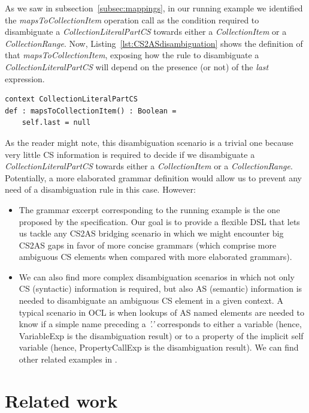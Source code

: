 \documentclass{llncs}
\begin{document}
As we saw in subsection~\ref{subsec:mappings}, in our running example we identified the \emph{mapsToCollectionItem} operation call as the condition required to disambiguate a \emph{CollectionLiteralPartCS} towards either a \emph{CollectionItem} or a \emph{CollectionRange}. Now, Listing~\ref{lst:CS2ASdisambiguation} shows the definition of that \emph{mapsToCollectionItem}, exposing how the rule to disambiguate a \emph{CollectionLiteralPartCS} will depend on the presence (or not) of the \emph{last} expression.

\begin{lstlisting}[caption=CS disambiguation rule of the running example, label=lst:CS2ASdisambiguation, language=OCL]
context CollectionLiteralPartCS
def : mapsToCollectionItem() : Boolean =
	self.last = null
\end{lstlisting}

As the reader might note, this disambiguation scenario is a trivial one because very little CS information is required to decide if we disambiguate a \emph{CollectionLiteralPartCS} towards either a \emph{CollectionItem} or a \emph{CollectionRange}. Potentially, a more elaborated grammar definition would allow us to prevent any need of a disambiguation rule in this case. However:

\begin{itemize}
\item The grammar excerpt corresponding to the running example is the one proposed by the specification. Our goal is to provide a flexible DSL that lets us tackle any CS2AS bridging scenario in which we might encounter big CS2AS gaps in favor of more concise grammars (which comprise more ambiguous CS elements when compared with more elaborated grammars).
\item We can also find more complex disambiguation scenarios in which not only CS (syntactic) information is required, but also AS (semantic) information is needed to disambiguate an ambiguous CS element in a given context. A typical scenario in OCL is when lookups of AS named elements are needed to know if a simple name preceding a \emph{'.'} corresponds to either a variable (hence, VariableExp is the disambiguation result) or to a property of the implicit self variable (hence, PropertyCallExp is the disambiguation result). We can find other related examples in \cite{willink2010oclXtext}.
\end{itemize}

\section{Related work}
\label{sec:relatedWork}
\end{document}

